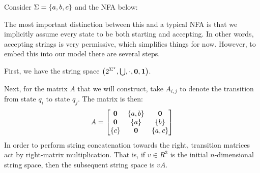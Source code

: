 \documentclass[12pt]{article}
\begin{document}
\begin{example}
  Consider \(\Sigma = \left\{a, b, c\right\}\) and the NFA below:

  \begin{center}
  \end{center}
  The most important distinction between this and a typical
  NFA is that we implicitly assume every state to be both starting
  and accepting.
  In other words, accepting strings is very permissive,
  which simplifies things for now.
  However,
  to embed this into our model there are several steps.

  First, we have the string space
  \(\left(2^{\Sigma^\star}, \bigcup, \cdot, \mathbf{0}, \mathbf{1}\right)\).

  Next, for the matrix \(A\) that we will construct,
  take \(A_{i, j}\) to denote the transition from state
  \(q_i\) to state \(q_j\).
  The matrix is then:
  \begin{align*}
    A =
      \begin{bmatrix}
        \mathbf{0} & \left\{a, b\right\} & \mathbf{0} \\
        \mathbf{0} & \left\{a\right\} & \left\{b\right\} \\
        \left\{c\right\} & \mathbf{0} & \left\{a, c\right\}
      \end{bmatrix}
  \end{align*}
  In order to perform string concatenation towards the right,
  transition matrices act by right-matrix multiplication.
  That is, if \(v \in R^3\) is the initial \(n\)-dimensional
  string space, then the subsequent string space is \(v A\).


\end{example}
\end{document}
